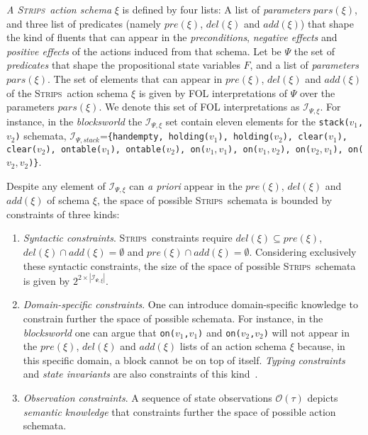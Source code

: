 \documentclass{article}
\newcommand{\strips}{\textsc{Strips}}
\begin{document}
{\em A \strips\ action schema} $\xi$ is defined by four lists: A list of {\em parameters} $pars(\xi)$, and three list of predicates (namely $pre(\xi)$, $del(\xi)$ and $add(\xi)$) that shape the kind of fluents that can appear in the {\em preconditions}, {\em negative effects} and {\em positive effects} of the actions induced from that schema. Let be $\Psi$ the set of {\em predicates} that shape the propositional state variables $F$, and a list of {\em parameters} $pars(\xi)$. The set of elements that can appear in $pre(\xi)$, $del(\xi)$ and $add(\xi)$ of the \strips\ action schema $\xi$ is given by FOL interpretations of $\Psi$ over the parameters $pars(\xi)$. We denote this set of FOL interpretations as ${\mathcal I}_{\Psi,\xi}$. For instance, in the {\em blocksworld} the ${\mathcal I}_{\Psi,\xi}$ set contain eleven elements for the {\small \tt stack($v_1$,$v_2$)} schemata, ${\mathcal I}_{\Psi,stack}$={\small\tt\{handempty, holding($v_1$), holding($v_2$), clear($v_1$), clear($v_2$), ontable($v_1$), ontable($v_2$), on($v_1,v_1$), on($v_1,v_2$), on($v_2,v_1$), on($v_2,v_2$)\}}. 

Despite any element of ${\mathcal I}_{\Psi,\xi}$ can {\em a priori} appear in the $pre(\xi)$, $del(\xi)$ and $add(\xi)$ of schema $\xi$, the space of possible \strips\ schemata is bounded by constraints of three kinds:
\begin{enumerate}
\item {\em Syntactic constraints}. \strips\ constraints require $del(\xi)\subseteq pre(\xi)$, $del(\xi)\cap add(\xi)=\emptyset$ and $pre(\xi)\cap add(\xi)=\emptyset$. Considering exclusively these syntactic constraints, the size of the space of possible \strips\ schemata is given by $2^{2\times|{\mathcal I}_{\Psi,\xi}|}$. 
\item {\em Domain-specific constraints}. One can introduce domain-specific knowledge to constrain further the space of possible schemata. For instance, in the {\em blocksworld} one can argue that {\small\tt on($v_1$,$v_1$)} and {\small\tt on($v_2$,$v_2$)} will not appear in the $pre(\xi)$, $del(\xi)$ and $add(\xi)$ lists of an action schema $\xi$ because, in this specific domain, a block cannot be on top of itself. {\em Typing constraints} and {\it state invariants} are also constraints of this kind~\cite{fox1998automatic}. 
\item {\em Observation constraints}. A sequence of state observations $\mathcal{O}(\tau)$ depicts {\em semantic knowledge} that constraints further the space of possible action schemata.   
\end{enumerate}
\end{document}
